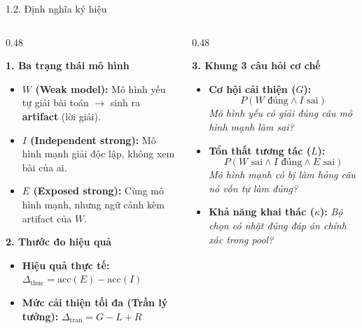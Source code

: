 \documentclass[aspectratio=169,10pt]{beamer}
\newcommand{\dceil}{\Delta_{\mathrm{tran}}}
\newcommand{\dhonest}{\Delta_{\mathrm{thuc}}}
\newcommand{\acc}{\mathrm{acc}}
\begin{document}
\begin{frame}{1.2. Định nghĩa ký hiệu}
  \begin{columns}[t]
    \begin{column}{0.48\textwidth}
      \begin{block}{\textbf{1. Ba trạng thái mô hình}}
        \begin{itemize}\footnotesize
          \item \textbf{$W$ (Weak model):} Mô hình yếu tự giải bài toán $\to$ sinh ra \textbf{artifact} (lời giải).
          \item \textbf{$I$ (Independent strong):} Mô hình mạnh giải độc lập, không xem bài của ai.
          \item \textbf{$E$ (Exposed strong):} Cùng mô hình mạnh, nhưng ngữ cảnh kèm artifact của $W$.
        \end{itemize}
      \end{block}
      
      \begin{exampleblock}{\textbf{2. Thước đo hiệu quả}}
        \begin{itemize}\footnotesize
          \item \textbf{Hiệu quả thực tế:} $\dhonest = \acc(E) - \acc(I)$
          \item \textbf{Mức cải thiện tối đa (Trần lý tưởng):} $\dceil = G - L + R$
        \end{itemize}
      \end{exampleblock}
    \end{column}
    
    \begin{column}{0.48\textwidth}
      \begin{block}{\textbf{3. Khung 3 câu hỏi cơ chế}}
        \begin{itemize}\footnotesize
          \item \textbf{Cơ hội cải thiện ($G$):}
          $$P(W \text{ đúng} \wedge I \text{ sai})$$
          \textit{Mô hình yếu có giải đúng câu mô hình mạnh làm sai?}
          
          \item \textbf{Tổn thất tương tác ($L$):}
          $$P(W \text{ sai} \wedge I \text{ đúng} \wedge E \text{ sai})$$
          \textit{Mô hình mạnh có bị làm hỏng câu nó vốn tự làm đúng?}
          
          \item \textbf{Khả năng khai thác ($\kappa$):}
          \textit{Bộ chọn có nhặt đúng đáp án chính xác trong pool?}
        \end{itemize}
      \end{block}
    \end{column}
  \end{columns}
\end{frame}
\end{document}
